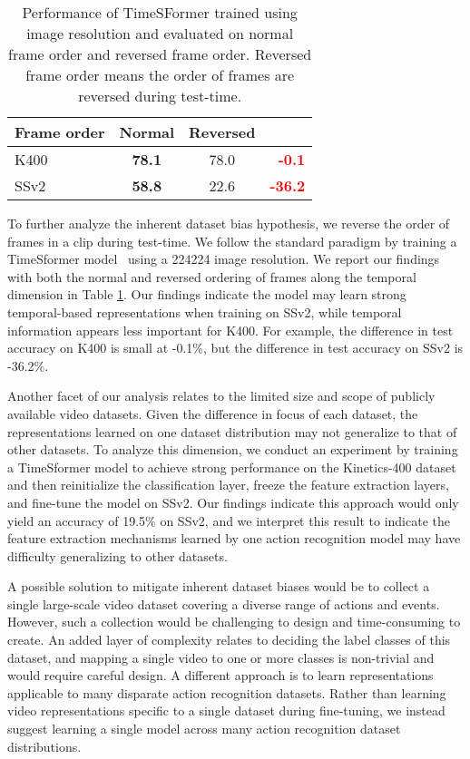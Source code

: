 \begin{table}[t]
\centering
\begin{tabular}{@{}lccr@{}}

\toprule
Frame order & Normal  & Reversed & \\
\midrule
K400 & \textbf{78.1} & 78.0 & \textbf{\textcolor{red}{-0.1}} \\
SSv2 & \textbf{58.8} & 22.6 & \textbf{\textcolor{red}{-36.2}}\\
\bottomrule
\end{tabular}
\caption{Performance of TimeSFormer trained using  image resolution and evaluated on normal frame order and reversed frame order. Reversed frame order means the order of frames are reversed during test-time.}
\label{tab:shuffle_test}
\vspace{-10pt}
\end{table} To further analyze the inherent dataset bias hypothesis, we reverse the order of frames in a clip during test-time. We follow the standard paradigm by training a TimeSformer model~\cite{bertasius2021space} using a 224224 image resolution. We report our findings with both the normal and reversed ordering of frames along the temporal dimension in Table \ref{tab:shuffle_test}. Our findings indicate the model may learn strong temporal-based representations when training on SSv2, while temporal information appears less important for K400. For example, the difference in test accuracy on K400 is small at -0.1\%, but the difference in test accuracy on SSv2 is -36.2\%. 


Another facet of our analysis relates to the limited size and scope of publicly available video datasets. Given the difference in focus of each dataset, the representations learned on one dataset distribution may not generalize to that of other datasets. To analyze this dimension, we conduct an experiment by training a TimeSformer model to achieve strong performance on the Kinetics-400 dataset and then reinitialize the classification layer, freeze the feature extraction layers, and fine-tune the model on SSv2. Our findings indicate this approach would only yield an accuracy of 19.5\% on SSv2, and we interpret this result to indicate the feature extraction mechanisms learned by one action recognition model may have difficulty generalizing to other datasets.



A possible solution to mitigate inherent dataset biases would be to collect a single large-scale video dataset covering a diverse range of actions and events. However, such a collection would be challenging to design and time-consuming to create. An added layer of complexity relates to deciding the label classes of this dataset, and mapping a single video to one or more classes is non-trivial and would require careful design. A different approach is to learn representations applicable to many disparate action recognition datasets. Rather than learning video representations specific to a single dataset during fine-tuning, we instead suggest learning a single model across many action recognition dataset distributions. 


